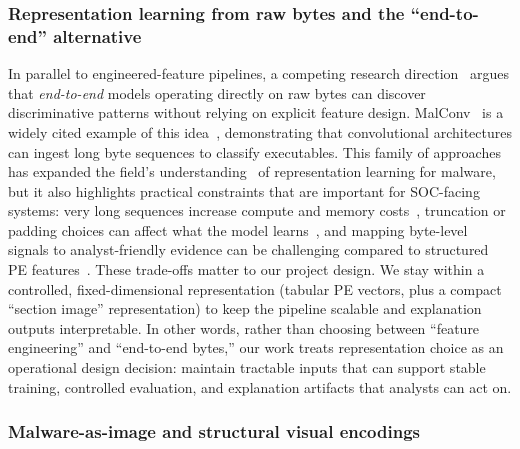 \documentclass[conference]{IEEEtran}
\begin{document}
\subsubsection{Representation learning from raw bytes and the ``end-to-end'' alternative}

In parallel to engineered-feature pipelines, a competing research direction~\cite{RBSBCN2017,KBSSSK2025} argues that \emph{end-to-end} models operating directly on raw bytes can discover discriminative patterns without relying on explicit feature design.
MalConv~\cite{RBSBCN2017} is a widely cited example of this idea~\cite{MT2025,EDS2020}, demonstrating that convolutional architectures can ingest long byte sequences to classify executables.
This family of approaches has expanded the field's understanding~\cite{RCEJH2025,KBSSSK2025} of representation learning for malware, but it also highlights practical constraints that are important for SOC-facing systems: very long sequences increase compute and memory costs~\cite{EDS2020}, truncation or padding choices can affect what the model learns~\cite{RBSBCN2017,AQPWPWCR2022}, and mapping byte-level signals to analyst-friendly evidence can be challenging compared to structured PE features~\cite{NSDSP2025,AQPWPWCR2022}.
These trade-offs matter to our project design.
We stay within a controlled, fixed-dimensional representation (tabular PE vectors, plus a compact ``section image'' representation) to keep the pipeline scalable and explanation outputs interpretable.
In other words, rather than choosing between ``feature engineering'' and ``end-to-end bytes,'' our work treats representation choice as an operational design decision: maintain tractable inputs that can support stable training, controlled evaluation, and explanation artifacts that analysts can act on.

\subsubsection{Malware-as-image and structural visual encodings}
\end{document}
